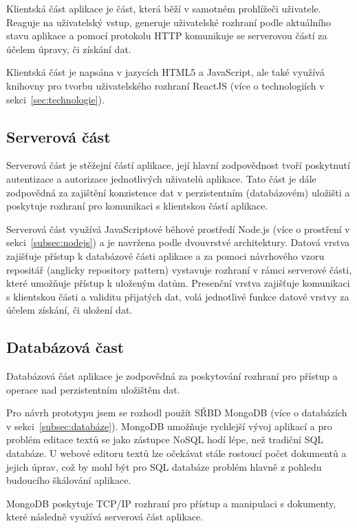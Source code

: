 Klientská část aplikace je část, která běží v samotném prohlížeči uživatele.
Reaguje na uživatelský vstup, generuje uživatelské rozhraní podle aktuálního stavu aplikace a pomocí protokolu \gls{HTTP} komunikuje se serverovou částí za účelem úpravy, či získání dat.

Klientská část je napsána v jazycích HTML5 a JavaScript, ale také využívá knihovny pro tvorbu uživatelského rozhraní ReactJS (více o technologiích v sekci~\ref{sec:technologie}).

\subsection{Serverová část}\label{subsec:serverováČást}

Serverová část je stěžejní částí aplikace, její hlavní zodpovědnost tvoří poskytnutí autentizace a autorizace jednotlivých uživatelů aplikace.
Tato část je dále zodpovědná za zajištění konzistence dat v perzistentním (databázovém) uložišti a poskytuje rozhraní pro komunikaci s klientskou částí aplikace.

Serverová část využívá JavaScriptové běhové prostředí Node.js (více o prostření v sekci~\ref{subsec:nodejs}) a je navržena podle dvouvrstvé architektury.
Datová vrstva zajišťuje přístup k databázové části aplikace a za pomoci návrhového vzoru repositář (anglicky repository pattern) vystavuje rozhraní v rámci serverové části, které umožňuje přístup k uloženým datům.
Presenční vrstva zajišťuje komunikaci s klientskou části a validitu přijatých dat, volá jednotlivé funkce datové vrstvy za účelem získání, či uložení dat.

\subsection{Databázová čast}\label{subsec:databázováČast}

Databázová část aplikace je zodpovědná za poskytování rozhraní pro přístup a operace nad perzistentním uložištěm dat.

Pro návrh prototypu jsem se rozhodl použít \gls{SŘBD} MongoDB (více o databázích v sekci~\ref{subsec:databáze}).
MongoDB umožňuje rychlejší vývoj aplikací a pro problém editace textů se jako zástupce \gls{NoSQL} hodí lépe, než tradiční \gls{SQL} databáze.
U webové editoru textů lze očekávat stále rostoucí počet dokumentů a jejich úprav, což by mohl být pro \gls{SQL} databáze problém hlavně z pohledu budoucího škálování aplikace.

MongoDB poskytuje \acrshort{TCP/IP} rozhraní pro přístup a manipulaci s dokumenty, které následně využívá serverová část aplikace.

